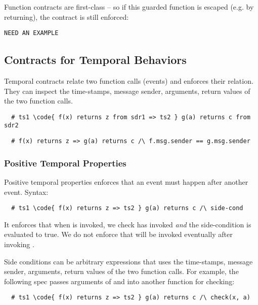 Function contracts are first-class -- so if this guarded function is escaped
(e.g. by returning), the contract is still enforced:
\begin{lstlisting}
NEED AN EXAMPLE
\end{lstlisting}
\fi

\subsection{Contracts for Temporal Behaviors}

Temporal contracts relate two function calls (events) and enforces their
relation.
They can inspect the time-stamps, message sender, arguments, return values
of the two function calls.

\begin{lstlisting}
  # ts1 \code{ f(x) returns z from sdr1 => ts2 } g(a) returns c from sdr2
\end{lstlisting}
\begin{lstlisting}
  # f(x) returns z => g(a) returns c /\ f.msg.sender == g.msg.sender
\end{lstlisting}

\subsubsection{Positive Temporal Properties}

Positive temporal properties enforces that an event must happen
after another event. Syntax:
\begin{lstlisting}
  # ts1 \code{ f(x) returns z => ts2 } g(a) returns c /\ side-cond
\end{lstlisting}
It enforces that when  is invoked, we check  has invoked \emph{and}
the side-condition is evaluated to true.
We do not enforce that  will be invoked eventually after invoking .

Side conditions can be arbitrary expressions that uses the time-stamps, message
sender, arguments, return values of the two function calls.
For example, the following spec passes arguments of  and  into
another function for checking:

\begin{lstlisting}
  # ts1 \code{ f(x) returns z => ts2 } g(a) returns c /\ check(x, a)
\end{lstlisting}

